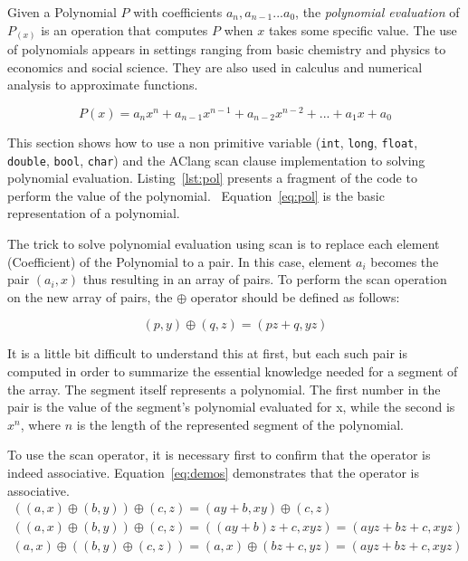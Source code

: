 \documentclass[Ingles]{ic-tese-v1}
\newcommand{\req}[1]{Equation~\ref{eq:#1}}
\newcommand{\ttt}[1]{{\texttt{#1}}}
\newcommand{\rlst}[1]{Listing~\ref{lst:#1}}
\begin{document}
Given a Polynomial $P$ with coefficients $a_{n}, a_{n-1} ... a_{0}$, the \textit{polynomial evaluation} of $P_{(x)}$ is an operation
that computes $P$ when $x$ takes some specific value. The use of polynomials
appears in settings ranging from basic chemistry and physics to economics and social science.
They are also used in calculus and numerical analysis to approximate  functions.

\begin{equation}
P(x) = a_{n}x^n + a_{n-1}x^{n-1} + a_{n-2}x^{n-2} + ... + a_{1}x + a_{0}
\label{eq:pol}
\end{equation}

This section shows how to use a non primitive variable (\ttt{int}, \ttt{long}, \ttt{float}, \ttt{double}, \ttt{bool}, \ttt{char})
and the AClang scan clause implementation to solving polynomial evaluation. \rlst{pol} presents
a fragment of the code to perform the value of the polynomial. ~\req{pol} is the basic
representation of a polynomial.

The trick to solve polynomial evaluation using scan is to replace each element (Coefficient) of the Polynomial to a pair. In this case,
element $a_{i}$ becomes the pair $(a_{i}, x)$ thus resulting in an array of pairs. To perform the scan operation on the new array of pairs,
the $\oplus$ operator should be defined  as follows:

\begin{equation}
(p, y) \oplus (q, z) = (p z + q, y z)
\label{eq:opepol}
\end{equation}

It is a little  bit difficult to understand this at first, but
each such pair is computed in order to summarize the essential knowledge needed for a
segment of the array. The segment itself represents a polynomial. The first
number in the pair is the value of the segment's polynomial evaluated for x,
while the second is $x^{n}$, where $n$ is the length of the represented segment
of the polynomial.

To use the scan operator, it is  necessary first to confirm that the operator is indeed associative.
\req{demos}  demonstrates that the operator is associative.
\begin{equation}
\begin{split}
((a, x) \oplus (b, y)) \oplus (c, z) = (a y + b, x y) \oplus (c, z) \\
((a, x) \oplus (b, y)) \oplus (c, z) = ((a y + b) z + c, x y z) = (a y z + b z + c, x y z)\\
(a, x) \oplus ((b, y) \oplus (c, z)) = (a, x) \oplus (b z + c, y z) = (a y z + b z + c, x y z)
\end{split}
\label{eq:demos}
\end{equation}
\end{document}
